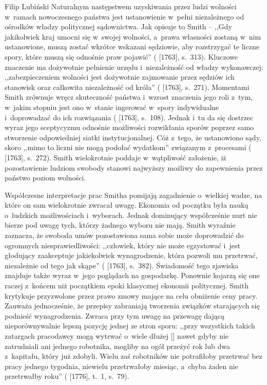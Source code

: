 \begin{artplenv}{Filip Lubiński}
Naturalnym następstwem uzyskiwania przez ludzi wolności w~ramach nowoczesnego państwa jest ustanowienie w~pełni
niezależnego od ośrodków władzy politycznej sądownictwa. Jak opisuje to Smith -- ,,Gdy jakikolwiek kraj umocni
się w~swojej wolności, a~prawa własności zostaną w~nim ustanowione, muszą zostać wkrótce wskazani sędziowie, aby rozstrzygać
te liczne spory, które muszą się odnośnie praw pojawić''
(\cite{smith_lectures_1982} [1763], s.~313).
Kluczowe
znaczenie ma dożywotnie pełnienie urzędu i~niezależność od władzy wykonawczej: ,,zabezpieczeniem wolności jest
dożywotnie zajmowanie przez sędziów ich stanowisk oraz całkowita niezależność od króla''
(\cite{smith_lectures_1982} [1763], s.~271).
Momentami Smith zrównuje wręcz skuteczność państwa i~wzrost
znaczenia jego roli z~tym, w~jakim stopniu jest ono w~stanie ingerować w~spory indywidualne i~doprowadzać do ich
rozwiązania
(\cite{smith_lectures_1982} [1763], s.~108).
Jednak i~tu da się dostrzec wyraz jego sceptycyzmu
odnośnie możliwości rozwikłania sporów poprzez samo stworzenie odpowiedniej siatki instytucjonalnej. Cóż z~tego, że
ustanowiono sądy, skoro ,,mimo to liczni nie mogą podołać wydatkom'' związanym z~procesami
(\cite{smith_lectures_1982} [1763], s.~272).
Smith wielokrotnie poddaje w~wątpliwość założenie, iż
pozostawienie ludziom swobody stanowi najwyższy możliwy do zapewnienia przez państwo poziom wolności.

Współczesne interpretacje prac Smitha pomijają zagadnienie o~wielkiej wadze, na które on sam wielokrotnie zwracał
uwagę. Ekonomia od początku była nauką o~ludzkich możliwościach i~wyborach. Jednak dominujący współcześnie nurt nie
bierze pod uwagę tych, którzy żadnego wyboru nie mają. Smith wyraźnie zaznacza, że swoboda umów pozostawiona sama sobie
może doprowadzić do ogromnych niesprawiedliwości: ,,człowiek, który nie może egzystować i~jest głodujący zaakceptuje
jakiekolwiek wynagrodzenie, która pozwoli mu przetrwać, niezależnie od tego jak skąpe''
(\cite{smith_lectures_1982} [1763], s.~382).
Świadomość tego zjawiska znajduje także wyraz w~jego poglądach na gospodarkę. Ponownie kojarzą
się one raczej z~końcem niż początkiem epoki klasycznej ekonomii politycznej. Smith krytykuje przyzwolone przez prawo
zmowy mające na celu obniżenie ceny pracy. Zauważa jednocześnie, że przepisy zabraniają tworzenia związków starających
się podnieść wynagrodzenia. Zwraca przy tym uwagę na przewagę dającą nieporównywalnie lepszą pozycję jednej ze stron
sporu: ,,przy wszystkich takich zatargach pracodawcy mogą wytrwać o~wiele dłużej [\mydots] nawet gdyby nie zatrudniali ani
jednego robotnika, mogliby na ogół przeżyć rok lub dwa z~kapitału, który już zdobyli. Wielu zaś robotników nie
potrafiłoby przetrwać bez pracy jednego tygodnia, niewielu przetrwałoby miesiąc, a~chyba żaden nie przetrwałby roku''
(\cite{smith_badania_2007} [1776], t.~1, s.~79).


\end{artplenv}
